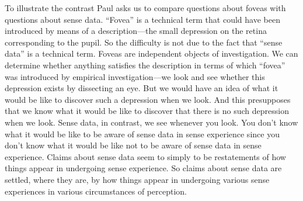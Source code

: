 \documentclass[11pt]{article}
\begin{document}
To illustrate the contrast Paul asks us to compare questions about foveas with questions about sense data. ``Fovea'' is a technical term that could have been introduced by means of a description---the small depression on the retina corresponding to the pupil. So the difficulty is not due to the fact that ``sense data'' is a technical term. Foveas are independent objects of investigation. We can determine whether anything satisfies the description in terms of which ``fovea'' was introduced by empirical investigation---we look and see whether this depression exists by dissecting an eye. But we would have an idea of what it would be like to discover such a depression when we look. And this presupposes that we know what it would be like to discover that there is no such depression when we look. Sense data, in contrast, we see whenever you look. You don't know what it would be like to be aware of sense data in sense experience since you don't know what it would be like not to be aware of sense data in sense experience. Claims about sense data seem to simply to be restatements of how things appear in undergoing sense experience. So claims about sense data are settled, where they are, by how things appear in undergoing various sense experiences in various circumstances of perception.
\end{document}
